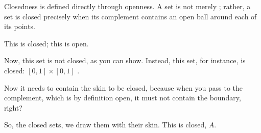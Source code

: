 \begin{content}

\begin{steps}
Closedness is defined directly through openness. A set is not merely ; rather, a set is closed precisely when its complement contains an open ball around each of its points.
\end{steps}
\end{content}

\begin{speech}[00:09:15 - 00:10:15]
This is closed; this is open.

Now, this set is not closed, as you can show. Instead, this set, for instance, is closed: $[0, 1] \times [0, 1]$ .

Now it needs to contain the skin to be closed, because when you pass to the complement, which is by definition open, it must not contain the boundary, right?

So, the closed sets, we draw them with their skin. This is closed, $A$. 
\end{speech}

